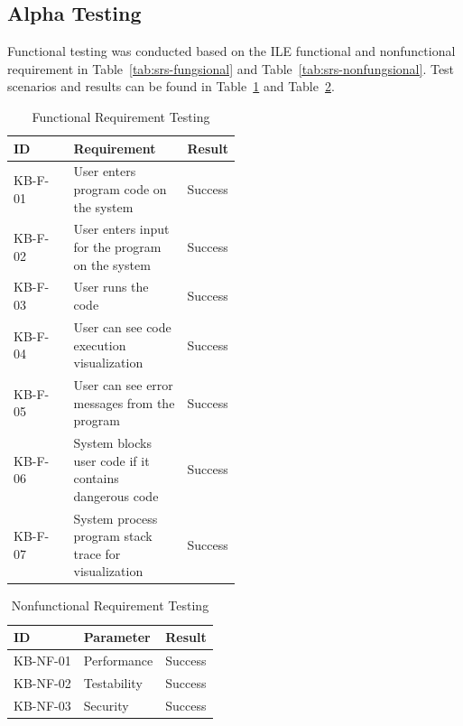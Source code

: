 \documentclass[conference]{IEEEtran}
\begin{document}
\subsection{Alpha Testing}
Functional testing was conducted based on the ILE functional and nonfunctional requirement in Table~\ref{tab:srs-fungsional} and Table~\ref{tab:srs-nonfungsional}. Test scenarios and results can be found in Table~\ref{tab:fungsional-testing} and Table~\ref{tab:nonfungsional-testing}.
\begin{table}[htbp]
  \caption{Functional Requirement Testing}
  \begin{center}
    \begin{tabular}{|l|p{0.5\linewidth}|l|}
      \hline
      \textbf{ID} & \textbf{Requirement}                                  & \textbf{Result} \\ \hline
      KB-F-01     & User enters program code on the system                & Success         \\ \hline
      KB-F-02     & User enters input for the program on the system       & Success         \\ \hline
      KB-F-03     & User runs the code                                    & Success         \\ \hline
      KB-F-04     & User can see code execution visualization             & Success         \\ \hline
      KB-F-05     & User can see error messages from the program          & Success         \\ \hline
      KB-F-06     & System blocks user code if it contains dangerous code & Success         \\ \hline
      KB-F-07     & System process program stack trace for visualization  & Success         \\ \hline
    \end{tabular}
    \label{tab:fungsional-testing}
  \end{center}
\end{table}
\begin{table}[htbp]
  \caption{Nonfunctional Requirement Testing}
  \begin{center}
    \begin{tabular}{|l|l|l|}
      \hline
      \textbf{ID} & \textbf{Parameter} & \textbf{Result} \\ \hline
      KB-NF-01    & Performance        & Success         \\ \hline
      KB-NF-02    & Testability        & Success         \\ \hline
      KB-NF-03    & Security           & Success         \\ \hline
    \end{tabular}
    \label{tab:nonfungsional-testing}
  \end{center}
\end{table}
\end{document}
